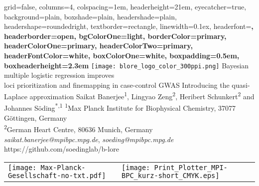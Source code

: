 \documentclass[a0paper,portrait,debug]{baposter}
\begin{document}
\setlength{\belowdisplayskip}{0pt} 
\setlength{\belowdisplayshortskip}{0pt} 
\setlength{\abovedisplayskip}{0pt} 
\setlength{\abovedisplayshortskip}{0pt}


\begin{poster}
{
%
%
	grid=false,
	columns=4,
	colspacing=1em,				%
	headerheight=21em, 				%
	eyecatcher=true,
	background=plain,
  	boxshade=plain,
	headershade=plain,  	
	headershape=roundedright,		%
	textborder=rectangle,			%
	linewidth=0.1ex,				%
        headerfont=\rmfamily\bfseries\large,
	headerborder=open,
	bgColorOne=light, 
	borderColor=primary,
	headerColorOne=primary,
	headerColorTwo=primary,
	headerFontColor=white,
	boxColorOne=white,
	boxpadding=0.5em,					%
	boxheaderheight=2.3em				%
}
{\texttt{[image: blore\_logo\_color\_300ppi.png]}} %
{\color{primary}Bayesian multiple logistic regression improves\\loci prioritization and finemapping in case-control GWAS}
{Introducing the quasi-Laplace approximation}
{Saikat Banerjee\textsuperscript{1}, Lingyao Zeng\textsuperscript{2}, Heribert Schunkert\textsuperscript{2} and Johannes S\"oding\textsuperscript{*,1}} %
{
  \textsuperscript{1}Max Planck Institute for Biophysical Chemistry, 37077 G\"ottingen, Germany\\[0.2em]
  \textsuperscript{2}German Heart Centre, 80636 Munich, Germany\\[0.5em]
  {\color{primary} {\LARGE \faEnvelopeSquare} \hspace{0.2em}\emph{saikat.banerjee@mpibpc.mpg.de}, \emph{soeding@mpibpc.mpg.de}}\\[0.5em]
  {\color{mpibpcmaroon} {\LARGE \faGithubSquare} \hspace{0.2em} https://github.com/soedinglab/b-lore}
}
{
\begin{tabular}{l l}
  \texttt{[image: Max-Planck-Gesellschaft-no-txt.pdf]} & \texttt{[image: Print\_Plotter\_MPI-BPC\_kurz-short\_CMYK.eps]} \\
\end{tabular}
}


\end{poster}
\end{document}
